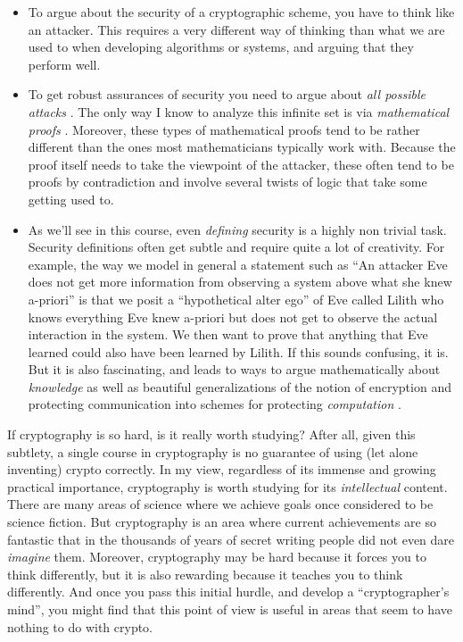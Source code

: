 \begin{itemize}
\item
  To argue about the security of a cryptographic scheme, you have to
  think like an attacker. This requires a very different way of thinking
  than what we are used to when developing algorithms or systems, and
  arguing that they perform well.
\item
  To get robust assurances of security you need to argue about \emph{all
  possible attacks} . The only way I know to analyze this infinite set
  is via \emph{mathematical proofs} . Moreover, these types of
  mathematical proofs tend to be rather different than the ones most
  mathematicians typically work with. Because the proof itself needs to
  take the viewpoint of the attacker, these often tend to be proofs by
  contradiction and involve several twists of logic that take some
  getting used to.
\item
  As we'll see in this course, even \emph{defining} security is a highly
  non trivial task. Security definitions often get subtle and require
  quite a lot of creativity. For example, the way we model in general a
  statement such as ``An attacker Eve does not get more information from
  observing a system above what she knew a-priori'' is that we posit a
  ``hypothetical alter ego'' of Eve called Lilith who knows everything
  Eve knew a-priori but does not get to observe the actual interaction
  in the system. We then want to prove that anything that Eve learned
  could also have been learned by Lilith. If this sounds confusing, it
  is. But it is also fascinating, and leads to ways to argue
  mathematically about \emph{knowledge} as well as beautiful
  generalizations of the notion of encryption and protecting
  communication into schemes for protecting \emph{computation} .
\end{itemize}

If cryptography is so hard, is it really worth studying? After all,
given this subtlety, a single course in cryptography is no guarantee of
using (let alone inventing) crypto correctly. In my view, regardless of
its immense and growing practical importance, cryptography is worth
studying for its \emph{intellectual} content. There are many areas of
science where we achieve goals once considered to be science fiction.
But cryptography is an area where current achievements are so fantastic
that in the thousands of years of secret writing people did not even
dare \emph{imagine} them. Moreover, cryptography may be hard because it
forces you to think differently, but it is also rewarding because it
teaches you to think differently. And once you pass this initial hurdle,
and develop a ``cryptographer's mind'', you might find that this point
of view is useful in areas that seem to have nothing to do with crypto.
